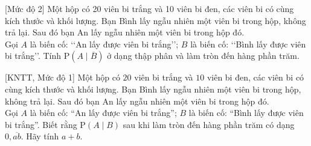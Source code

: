 \begin{bt}%
[Mức độ 2]%
	Một hộp có 20 viên bi trắng và 10 viên bi đen, các viên bi có cùng kích thước và khối lượng. Bạn Bình lấy ngẫu nhiên một viên bi trong hộp, không trả lại. Sau đó bạn An lấy ngẫu nhiên một viên bi trong hộp đó.\\
	Gọi $A$ là biến cố: \lq\lq An lấy được viên bi trắng\rq\rq; $B$ là biến cố: \lq\lq Bình lấy được viên bi trắng\rq\rq. Tính $\mathrm{P}(A\mid\overline{B})$ ở dạng thập phân và làm tròn đến hàng phần trăm.
\end{bt}

\begin{bt}%
[KNTT, Mức độ 1]%
	Một hộp có $20$ viên bi trắng và $10$ viên bi đen, các viên bi có cùng kích thước và khối lượng. Bạn Bình lấy ngẫu nhiên một viên bi trong hộp, không trả lại. Sau đó bạn An lấy ngẫu nhiên một viên bi trong hộp đó.\\
	Gọi $A$ là biến cố: ``An lấy được viên bi trắng''; $B$ là biến cố: ``Bình lấy được viên bi trắng''. Biết rằng $\mathrm{P}(A\mid B)$ sau khi làm tròn đến hàng phần trăm có dạng $0{,}\overline{ab}$. Hãy tính $a+b$.
\end{bt}

